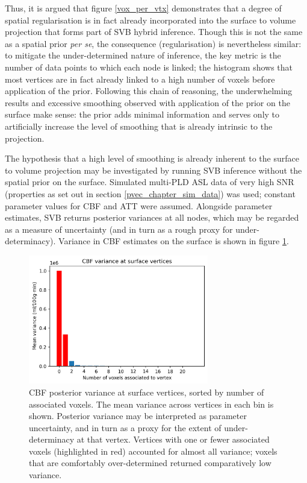 \documentclass[12pt]{report}
\begin{document}
Thus, it is argued that figure \ref{vox_per_vtx} demonstrates that a degree of spatial regularisation is in fact already incorporated into the surface to volume projection that forms part of SVB hybrid inference. Though this is not the same as a spatial prior \textit{per se}, the consequence (regularisation) is nevertheless similar: to mitigate the under-determined nature of inference, the key metric is the number of data points to which each node is linked; the histogram shows that most vertices are in fact already linked to a high number of voxels before application of the prior. Following this chain of reasoning, the underwhelming results and excessive smoothing observed with application of the prior on the surface make sense: the prior adds minimal information and serves only to artificially increase the level of smoothing that is already intrinsic to the projection. 

The hypothesis that a high level of smoothing is already inherent to the surface to volume projection may be investigated by running SVB inference without the spatial prior on the surface. Simulated multi-PLD ASL data of very high SNR (properties as set out in section \ref{pvec_chapter_sim_data}) was used; constant parameter values for CBF and ATT were assumed. Alongside parameter estimates, SVB returns posterior variances at all nodes, which may be regarded as a measure of uncertainty (and in turn as a rough proxy for under-determinacy). Variance in CBF estimates on the surface is shown in figure \ref{var_at_vtx}. 

\begin{figure}[H]
\centering
\includegraphics[width=0.7\textwidth]{var_at_vtx.png}
\caption{CBF posterior variance at surface vertices, sorted by number of associated voxels. The mean variance across vertices in each bin is shown. Posterior variance may be interpreted as parameter uncertainty, and in turn as a proxy for the extent of under-determinacy at that vertex. Vertices with one or fewer associated voxels (highlighted in red) accounted for almost all variance; voxels that are comfortably over-determined returned comparatively low variance.}
\label{var_at_vtx} 
\end{figure}
\end{document}
